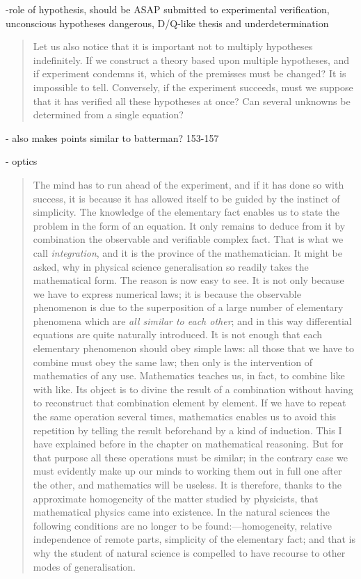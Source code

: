  -role of hypothesis, should be ASAP submitted to experimental verification, unconscious hypotheses dangerous, D/Q-like thesis and underdetermination
 
 \begin{quote}
     Let us also notice that it is important not to multiply hypotheses indefinitely.  If we construct a theory based upon multiple hypotheses, and if experiment condemns it, which of the premisses must be changed?  It is impossible to tell.  Conversely, if the experiment succeeds, must we suppose that it has verified all these hypotheses at once?  Can several unknowns be determined from a single equation?  \citep[p. 151-152]{Poincare1952}
 \end{quote}
 
 - also makes points similar to batterman?  153-157
 
 - optics
 
 \begin{quote}
     The mind has to run ahead of the experiment, and if it has done so with success, it is because it has allowed itself to be guided by the instinct of simplicity.  The knowledge of the elementary fact enables us to state the problem in the form of an equation.  It only remains to deduce from it by combination the observable and verifiable complex fact.  That is what we call \emph{integration}, and it is the province of the mathematician.  It might be asked, why in physical science generalisation so readily takes the mathematical form.  The reason is now easy to see.  It is not only because we have to express numerical laws; it is because the observable phenomenon is due to the superposition of a large number of elementary phenomena which are \emph{all similar to each other}; and in this way differential equations are quite naturally introduced.  It is not enough that each elementary phenomenon should obey simple laws: all those that we have to combine must obey the same law; then only is the intervention of mathematics of any use.  Mathematics teaches us, in fact, to combine like with like.  Its object is to divine the result of a combination without having to reconstruct that combination element by element.  If we have to repeat the same operation several times, mathematics enables us to avoid this repetition by telling the result beforehand by a kind of induction.  This I have explained before in the chapter on mathematical reasoning.  But for that purpose all these operations must be similar; in the contrary case we must evidently make up our minds to working them out in full one after the other, and mathematics will be useless.  It is therefore, thanks to the approximate homogeneity of the matter studied by physicists, that mathematical physics came into existence.  In the natural sciences the following conditions are no longer to be found:---homogeneity, relative independence of remote parts, simplicity of the elementary fact; and that is why the student of natural science is compelled to have recourse to other modes of generalisation.  \citep[p. 158-159]{Poincare1952}
 \end{quote}
 
